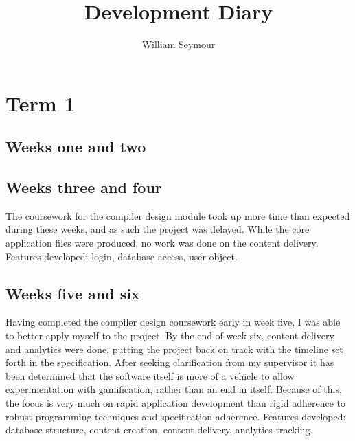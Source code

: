 \documentclass[10pt,a4paper]{article}
\author{William Seymour}
\title{Development Diary}
\begin{document}
	\section*{Term 1}
	\subsection*{Weeks one and two}
	\subsection*{Weeks three and four}
	The coursework for the compiler design module took up more time than expected during these weeks, and as such the project was delayed. While the core application files were produced, no work was done on the content delivery. Features developed: login, database access, user object.
	\subsection*{Weeks five and six}
	Having completed the compiler design coursework early in week five, I was able to better apply myself to the project. By the end of week six, content delivery and analytics were done, putting the project back on track with the timeline set forth in the specification. After seeking clarification from my supervisor it has been determined that the software itself is more of a vehicle to allow experimentation with gamification, rather than an end in itself. Because of this, the focus is very much on rapid application development than rigid adherence to robust programming techniques and specification adherence. Features developed: database structure, content creation, content delivery, analytics tracking.
\end{document}
